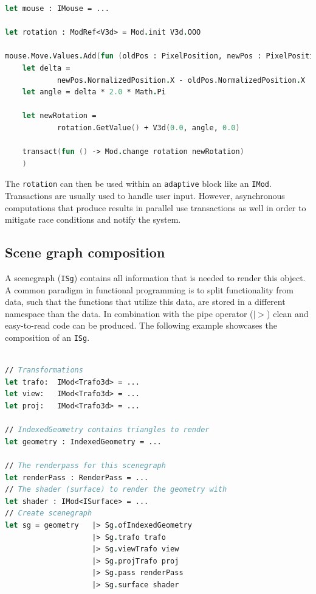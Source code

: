 \begin{lstlisting}[language = FSharp]
let mouse : IMouse = ...

let rotation : ModRef<V3d> = Mod.init V3d.OOO

mouse.Move.Values.Add(fun (oldPos : PixelPosition, newPos : PixelPosition) -> 
    let delta = 
			newPos.NormalizedPosition.X - oldPos.NormalizedPosition.X
    let angle = delta * 2.0 * Math.Pi
    
    let newRotation = 
			rotation.GetValue() + V3d(0.0, angle, 0.0)
    
    transact(fun () -> Mod.change rotation newRotation)
    )
\end{lstlisting}

The \verb|rotation| can then be used within an \verb|adaptive| block like an \verb|IMod|. 
\\
Transactions are usually used to handle user input. However, asynchronous computations that produce results in parallel use transactions as well in order to mitigate race conditions and notify the system. 


\subsection{Scene graph composition}
\label{sec:isg}
A scenegraph (\verb|ISg|) contains all information that is needed to render this object. A common paradigm in functional programming is to split functionality from data, such that the functions that utilize this data, are stored in a different namespace than the data. In combination with the pipe operator ($|>$) clean and easy-to-read code can be produced. The following example showcases the composition of an \verb|ISg|. 

\begin{lstlisting}[language = FSharp]

// Transformations
let trafo:	IMod<Trafo3d> = ... 
let view:	IMod<Trafo3d> = ...
let proj:	IMod<Trafo3d> = ...

// IndexedGeometry contains triangles to render
let geometry : IndexedGeometry = ...

// The renderpass for this scenegraph
let renderPass : RenderPass = ...
// The shader (surface) to render the geometry with
let shader : IMod<ISurface> = ...
// Create scenegraph
let sg = geometry	|> Sg.ofIndexedGeometry
                    |> Sg.trafo trafo
                    |> Sg.viewTrafo view
                    |> Sg.projTrafo proj
                    |> Sg.pass renderPass
                    |> Sg.surface shader
\end{lstlisting}

